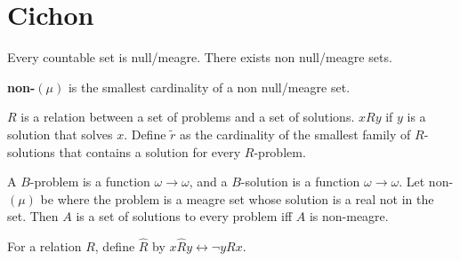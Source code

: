 \section{Cichon}
  \begin{fact}
    Every countable set is null/meagre. There exists non null/meagre sets.
  \end{fact}

  \begin{definition}
    \textbf{non-$(\mu)$} is the smallest cardinality of a non null/meagre set.
  \end{definition}

  \begin{definition}
    $R$ is a relation between a set of problems and a set of solutions.
    $xRy$ if $y$ is a solution that solves $x$. Define $\tilde{r}$ as the
    cardinality of the smallest family of $R$-solutions that contains a
    solution for every $R$-problem.
  \end{definition}

  \begin{example}
    A $B$-problem is a function $\omega\rightarrow\omega$, and
    a $B$-solution is a function $\omega\rightarrow\omega$. Let non-$(\mu)$
    be where the problem is a meagre set whose solution is a real not in
    the set. Then $A$ is a set of solutions to every problem iff $A$ is
    non-meagre.
  \end{example}

  \begin{definition}
    For a relation $R$, define $\hat{R}$ by $x\hat{R}y \leftrightarrow \neg
    yRx$.
  \end{definition}
